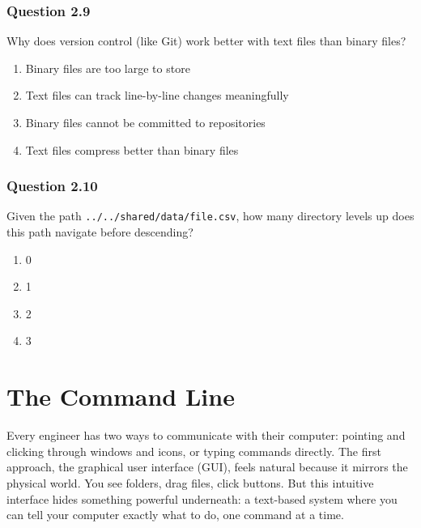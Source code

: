 \documentclass[
  letterpaper,
  DIV=11,
  numbers=noendperiod]{scrreprt}
\providecommand{\tightlist}{%
  \setlength{\itemsep}{0pt}\setlength{\parskip}{0pt}}
\begin{document}
\subsection{Question 2.9}\label{question-2.9}

Why does version control (like Git) work better with text files than
binary files?

\begin{enumerate}
\def\labelenumi{\Alph{enumi})}
\tightlist
\item
  Binary files are too large to store\\
\item
  Text files can track line-by-line changes meaningfully\\
\item
  Binary files cannot be committed to repositories\\
\item
  Text files compress better than binary files
\end{enumerate}

\subsection{Question 2.10}\label{question-2.10}

Given the path \texttt{../../shared/data/file.csv}, how many directory
levels up does this path navigate before descending?

\begin{enumerate}
\def\labelenumi{\Alph{enumi})}
\tightlist
\item
  0\\
\item
  1\\
\item
  2\\
\item
  3
\end{enumerate}

\chapter{The Command Line}\label{sec-cli}

Every engineer has two ways to communicate with their computer: pointing
and clicking through windows and icons, or typing commands directly. The
first approach, the graphical user interface (GUI), feels natural
because it mirrors the physical world. You see folders, drag files,
click buttons. But this intuitive interface hides something powerful
underneath: a text-based system where you can tell your computer exactly
what to do, one command at a time.
\end{document}

